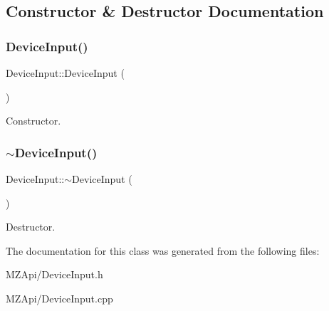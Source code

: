 \subsection{Constructor \& Destructor Documentation}
\mbox{\label{classDeviceInput_a5a5d144c0a4a2d0fedfd85fcb687a716}} 
\subsubsection{\texorpdfstring{Device\+Input()}{DeviceInput()}}
{\footnotesize\ttfamily Device\+Input\+::\+Device\+Input (\begin{DoxyParamCaption}{ }\end{DoxyParamCaption})}

Constructor. \mbox{\label{classDeviceInput_a6c06d020cca58b3d4763e1717382b1a8}} 
\subsubsection{\texorpdfstring{$\sim$\+Device\+Input()}{~DeviceInput()}}
{\footnotesize\ttfamily Device\+Input\+::$\sim$\+Device\+Input (\begin{DoxyParamCaption}{ }\end{DoxyParamCaption})}

Destructor. 

The documentation for this class was generated from the following files\+:\begin{DoxyCompactItemize}
\item 
M\+Z\+Api/Device\+Input.\+h\item 
M\+Z\+Api/Device\+Input.\+cpp\end{DoxyCompactItemize}
